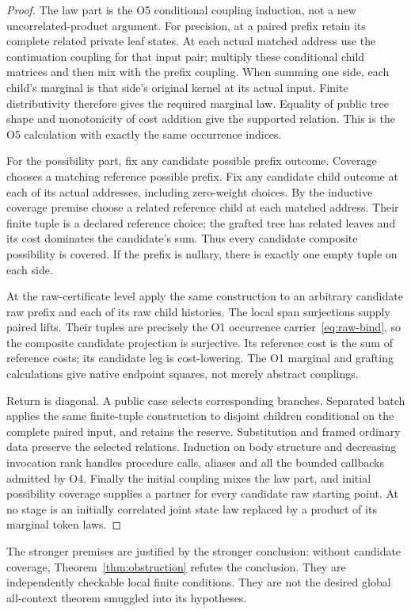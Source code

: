 \documentclass[11pt,a4paper]{article}
\theoremstyle{definition}
\begin{document}
\begin{proof}
The law part is the O5 conditional coupling induction, not a new
uncorrelated-product argument. For precision, at a paired prefix retain
its complete related private leaf states. At each actual matched address
use the continuation coupling for that input pair; multiply these
conditional child matrices and then mix with the prefix coupling. When
summing one side, each child's marginal is that side's original kernel
at its actual input. Finite distributivity therefore gives the required
marginal law. Equality of public tree shape and monotonicity of cost
addition give the supported relation. This is the O5 calculation with
exactly the same occurrence indices.

For the possibility part, fix any candidate possible prefix outcome.
Coverage chooses a matching reference possible prefix. Fix any candidate
child outcome at each of its actual addresses, including zero-weight
choices. By the inductive coverage premise choose a related reference
child at each matched address. Their finite tuple is a declared reference
choice; the grafted tree has related leaves and its cost dominates the
candidate's sum. Thus every candidate composite possibility is covered.
If the prefix is nullary, there is exactly one empty tuple on each side.

At the raw-certificate level apply the same construction to an arbitrary
candidate raw prefix and each of its raw child histories. The local span
surjections supply paired lifts. Their tuples are precisely the O1
occurrence carrier~\eqref{eq:raw-bind}, so the composite candidate
projection is surjective. Its reference cost is the sum of reference
costs; its candidate leg is cost-lowering. The O1 marginal and grafting
calculations give native endpoint squares, not merely abstract couplings.

Return is diagonal. A public case selects corresponding branches.
Separated batch applies the same finite-tuple construction to disjoint
children conditional on the complete paired input, and retains the
reserve. Substitution and framed ordinary data preserve the selected
relations. Induction on body structure and decreasing invocation rank
handles procedure calls, aliases and all the bounded callbacks admitted
by O4. Finally the initial coupling mixes the law part, and initial
possibility coverage supplies a partner for every candidate raw starting
point. At no stage is an initially correlated joint state law replaced
by a product of its marginal token laws.
\end{proof}
The stronger premises are justified by the stronger conclusion: without
candidate coverage, Theorem~\ref{thm:obstruction} refutes the conclusion.
They are independently checkable local finite conditions. They are not
the desired global all-context theorem smuggled into its hypotheses.
\end{document}
